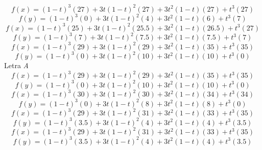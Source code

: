 \documentclass[11pt]{article}
\begin{document}
\begin{enumerate}
\begin{equation}
f(x) = (1-t)^{3}\left(27\right)+3t(1-t)^{2}\left(27\right)+3t^{2}(1-t)\left(27\right)+t^{3}\left(27\right)
\end{equation}
\begin{equation}
f(y) = (1-t)^{3}\left(0\right)+3t(1-t)^{2}\left(4\right)+3t^{2}(1-t)\left(6\right)+t^{3}\left(7\right)
\end{equation}
\begin{equation}
f(x) = (1-t)^{3}\left(25\right)+3t(1-t)^{2}\left(25.5\right)+3t^{2}(1-t)\left(26.5\right)+t^{3}\left(27\right)
\end{equation}
\begin{equation}
f(y) = (1-t)^{3}\left(7\right)+3t(1-t)^{2}\left(7.5\right)+3t^{2}(1-t)\left(7.5\right)+t^{3}\left(7\right)
\end{equation}
\begin{equation}
f(x) = (1-t)^{3}\left(29\right)+3t(1-t)^{2}\left(29\right)+3t^{2}(1-t)\left(35\right)+t^{3}\left(35\right)
\end{equation}
\begin{equation}
f(y) = (1-t)^{3}\left(0\right)+3t(1-t)^{2}\left(10\right)+3t^{2}(1-t)\left(10\right)+t^{3}\left(0\right)
\end{equation}
Letra \emph{A}
\begin{equation}
f(x) = (1-t)^{3}\left(29\right)+3t(1-t)^{2}\left(29\right)+3t^{2}(1-t)\left(35\right)+t^{3}\left(35\right)
\end{equation}
\begin{equation}
f(y) = (1-t)^{3}\left(0\right)+3t(1-t)^{2}\left(10\right)+3t^{2}(1-t)\left(10\right)+t^{3}\left(0\right)
\end{equation}
\begin{equation}
f(x) = (1-t)^{3}\left(30\right)+3t(1-t)^{2}\left(30\right)+3t^{2}(1-t)\left(34\right)+t^{3}\left(34\right)
\end{equation}
\begin{equation}
f(y) = (1-t)^{3}\left(0\right)+3t(1-t)^{2}\left(8\right)+3t^{2}(1-t)\left(8\right)+t^{3}\left(0\right)
\end{equation}
\begin{equation}
f(x) = (1-t)^{3}\left(29\right)+3t(1-t)^{2}\left(31\right)+3t^{2}(1-t)\left(33\right)+t^{3}\left(35\right)
\end{equation}
\begin{equation}
f(y) = (1-t)^{3}\left(3.5\right)+3t(1-t)^{2}\left(4\right)+3t^{2}(1-t)\left(4\right)+t^{3}\left(3.5\right)
\end{equation}
\begin{equation}
f(x) = (1-t)^{3}\left(29\right)+3t(1-t)^{2}\left(31\right)+3t^{2}(1-t)\left(33\right)+t^{3}\left(35\right)
\end{equation}
\begin{equation}
f(y) = (1-t)^{3}\left(3.5\right)+3t(1-t)^{2}\left(4\right)+3t^{2}(1-t)\left(4\right)+t^{3}\left(3.5\right)
\end{equation}


\end{enumerate}
\end{document}
